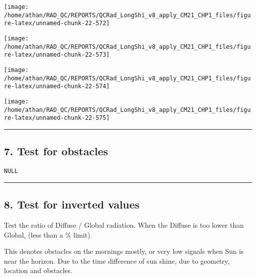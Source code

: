 \documentclass[
  10pt,
  a4paper,oneside]{article}
\begin{document}
\begin{center}\texttt{[image: /home/athan/RAD\_QC/REPORTS/QCRad\_LongShi\_v8\_apply\_CM21\_CHP1\_files/figure-latex/unnamed-chunk-22-572]} \end{center}

\begin{center}\texttt{[image: /home/athan/RAD\_QC/REPORTS/QCRad\_LongShi\_v8\_apply\_CM21\_CHP1\_files/figure-latex/unnamed-chunk-22-573]} \end{center}

\begin{center}\texttt{[image: /home/athan/RAD\_QC/REPORTS/QCRad\_LongShi\_v8\_apply\_CM21\_CHP1\_files/figure-latex/unnamed-chunk-22-574]} \end{center}

\begin{center}\texttt{[image: /home/athan/RAD\_QC/REPORTS/QCRad\_LongShi\_v8\_apply\_CM21\_CHP1\_files/figure-latex/unnamed-chunk-22-575]} \end{center}

\begin{center}\rule{0.5\linewidth}{0.5pt}\end{center}

\newpage

\hypertarget{test-for-obstacles}{%
\subsection{7. Test for obstacles}\label{test-for-obstacles}}

\begin{verbatim}
NULL
\end{verbatim}

\begin{center}\rule{0.5\linewidth}{0.5pt}\end{center}

\newpage

\hypertarget{test-for-inverted-values}{%
\subsection{8. Test for inverted values}\label{test-for-inverted-values}}

Test the ratio of Diffuse / Global radiation.
When the Diffuse is too lower than Global, (less than a \% limit).

This denotes obstacles on the mornings mostly, or very low
signals when Sun is near the horizon.
Due to the time difference of sun shine, due to geometry, location and
obstacles.
\end{document}
